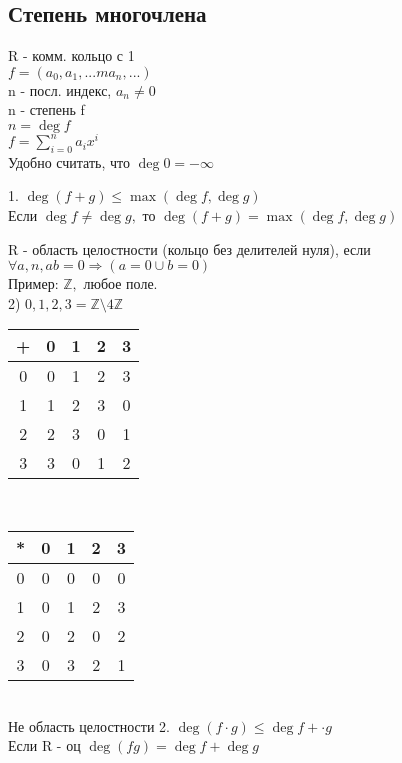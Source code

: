 \subsection{Степень многочлена}
R - комм. кольцо с 1 \\
$ f = (a_0, a_1, ...m a_n, ...) $ \\
n - посл. индекс, $ a_n \neq 0 $ \\
n - степень f \\
$ n = \deg f $\\
$ f = \sum_{i=0}^{n} a_i x^i $ \\
Удобно считать, что $ \deg 0 = -\infty $ \\
\begin{properties}
	1. $ \deg (f+g) \leq \max (\deg f , \deg g) $ \\
	Если $ \deg f \neq \deg g, $ то $ \deg (f+g) = \max (\deg f , \deg g) $ \\
	\begin{definition}
		R - область целостности (кольцо без делителей нуля), если $ \forall a, n, ab = 0 \Rightarrow (a=0 \cup b = 0) $ \\
		Пример: $ \mathbb{Z} , $ любое поле.\\
		2) $ {0, 1, 2, 3} = \mathbb{Z} \setminus 4 \mathbb{Z} $ \\
		\begin{tabular}{|c|c|c|c|c|}
			\hline 
			+& 0 & 1 & 2 &3  \\ 
			\hline 
			0&  0& 1 &2  &3  \\ 
			\hline 
			1& 1 & 2 & 3 & 0 \\ 
			\hline 
			2& 2 &3  & 0 &1  \\ 
			\hline 
			3& 3 & 0 & 1 & 2 \\ 
			\hline 
		\end{tabular} \\
		\begin{tabular}{|c|c|c|c|c|}
			\hline 
			*& 0 & 1 & 2 &3  \\ 
			\hline 
			0&  0& 0 & 0 & 0 \\ 
			\hline 
			1&0  & 1 & 2 &3  \\ 
			\hline 
			2&  0& 2 &0  &2  \\ 
			\hline 
			3& 0 & 3 & 2 & 1 \\ 
			\hline 
		\end{tabular}  \\
		Не область целостности 
		2. $ \deg (f \cdot g) \leq \deg f + \cdot g $ \\
		Если R - оц $ \deg(fg) = \deg f + \deg g $ \\

\end{definition}
\end{properties}
